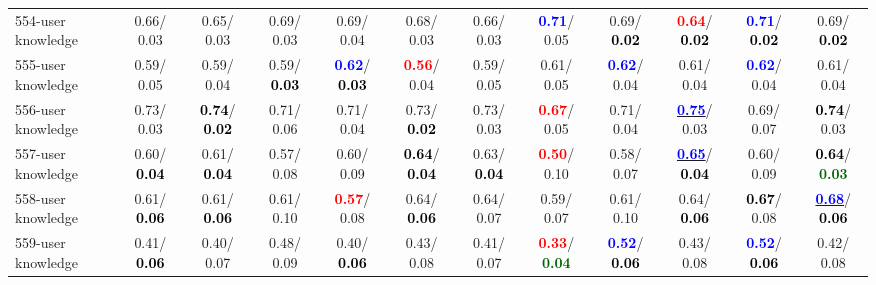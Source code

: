 \begin{table}[h]
\begin{center}
{\begin{tabular}{lc|c|c|c|c|c|c|c|c|c|c}
554-user knowledge &   0.66/  0.03 &   0.65/  0.03 &   0.69/  0.03 &   0.69/  0.04 &   0.68/  0.03 &   0.66/  0.03 & \textcolor{blue}{\textbf{  0.71}}/  0.05 &   0.69/\textcolor{black}{\textbf{  0.02}} & \textcolor{red}{\textbf{  0.64}}/\textcolor{black}{\textbf{  0.02}} & \textcolor{blue}{\textbf{  0.71}}/\textcolor{black}{\textbf{  0.02}} &   0.69/\textcolor{black}{\textbf{  0.02}} \\
555-user knowledge &   0.59/  0.05 &   0.59/  0.04 &   0.59/\textcolor{black}{\textbf{  0.03}} & \textcolor{blue}{\textbf{  0.62}}/\textcolor{black}{\textbf{  0.03}} & \textcolor{red}{\textbf{  0.56}}/  0.04 &   0.59/  0.05 &   0.61/  0.05 & \textcolor{blue}{\textbf{  0.62}}/  0.04 &   0.61/  0.04 & \textcolor{blue}{\textbf{  0.62}}/  0.04 &   0.61/  0.04 \\
556-user knowledge &   0.73/  0.03 & \textcolor{black}{\textbf{  0.74}}/\textcolor{black}{\textbf{  0.02}} &   0.71/  0.06 &   0.71/  0.04 &   0.73/\textcolor{black}{\textbf{  0.02}} &   0.73/  0.03 & \textcolor{red}{\textbf{  0.67}}/  0.05 &   0.71/  0.04 & \underline{\textcolor{blue}{\textbf{  0.75}}}/  0.03 &   0.69/  0.07 & \textcolor{black}{\textbf{  0.74}}/  0.03 \\
557-user knowledge &   0.60/\textcolor{black}{\textbf{  0.04}} &   0.61/\textcolor{black}{\textbf{  0.04}} &   0.57/  0.08 &   0.60/  0.09 & \textcolor{black}{\textbf{  0.64}}/\textcolor{black}{\textbf{  0.04}} &   0.63/\textcolor{black}{\textbf{  0.04}} & \textcolor{red}{\textbf{  0.50}}/  0.10 &   0.58/  0.07 & \underline{\textcolor{blue}{\textbf{  0.65}}}/\textcolor{black}{\textbf{  0.04}} &   0.60/  0.09 & \textcolor{black}{\textbf{  0.64}}/\textcolor{darkgreen}{\textbf{  0.03}} \\
558-user knowledge &   0.61/\textcolor{black}{\textbf{  0.06}} &   0.61/\textcolor{black}{\textbf{  0.06}} &   0.61/  0.10 & \textcolor{red}{\textbf{  0.57}}/  0.08 &   0.64/\textcolor{black}{\textbf{  0.06}} &   0.64/  0.07 &   0.59/  0.07 &   0.61/  0.10 &   0.64/\textcolor{black}{\textbf{  0.06}} & \textcolor{black}{\textbf{  0.67}}/  0.08 & \underline{\textcolor{blue}{\textbf{  0.68}}}/\textcolor{black}{\textbf{  0.06}} \\ \hline
559-user knowledge &   0.41/\textcolor{black}{\textbf{  0.06}} &   0.40/  0.07 &   0.48/  0.09 &   0.40/\textcolor{black}{\textbf{  0.06}} &   0.43/  0.08 &   0.41/  0.07 & \textcolor{red}{\textbf{  0.33}}/\textcolor{darkgreen}{\textbf{  0.04}} & \textcolor{blue}{\textbf{  0.52}}/\textcolor{black}{\textbf{  0.06}} &   0.43/  0.08 & \textcolor{blue}{\textbf{  0.52}}/\textcolor{black}{\textbf{  0.06}} &   0.42/  0.08 \\

\end{tabular}}
\end{center}
\end{table}
